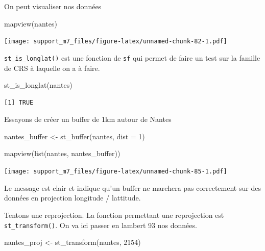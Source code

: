 \documentclass[
]{book}
\newenvironment{Shaded}{\begin{snugshade}}{\end{snugshade}}
\newcommand{\AttributeTok}[1]{\textcolor[rgb]{0.77,0.63,0.00}{#1}}
\newcommand{\DecValTok}[1]{\textcolor[rgb]{0.00,0.00,0.81}{#1}}
\newcommand{\FunctionTok}[1]{\textcolor[rgb]{0.00,0.00,0.00}{#1}}
\newcommand{\NormalTok}[1]{#1}
\newcommand{\OtherTok}[1]{\textcolor[rgb]{0.56,0.35,0.01}{#1}}
\begin{document}
On peut visualiser nos données

\begin{Shaded}
\begin{Highlighting}[]
\FunctionTok{mapview}\NormalTok{(nantes)}
\end{Highlighting}
\end{Shaded}

\texttt{[image: support\_m7\_files/figure-latex/unnamed-chunk-82-1.pdf]}

\texttt{st\_is\_longlat()} est une fonction de \texttt{sf} qui permet de faire un test sur la famille de CRS à laquelle on a à faire.

\begin{Shaded}
\begin{Highlighting}[]
\FunctionTok{st\_is\_longlat}\NormalTok{(nantes)}
\end{Highlighting}
\end{Shaded}

\begin{verbatim}
[1] TRUE
\end{verbatim}

Essayons de créer un buffer de 1km autour de Nantes

\begin{Shaded}
\begin{Highlighting}[]
\NormalTok{nantes\_buffer }\OtherTok{\textless{}{-}} \FunctionTok{st\_buffer}\NormalTok{(nantes, }\AttributeTok{dist =} \DecValTok{1}\NormalTok{)}
\end{Highlighting}
\end{Shaded}

\begin{Shaded}
\begin{Highlighting}[]
\FunctionTok{mapview}\NormalTok{(}\FunctionTok{list}\NormalTok{(nantes, nantes\_buffer))}
\end{Highlighting}
\end{Shaded}

\texttt{[image: support\_m7\_files/figure-latex/unnamed-chunk-85-1.pdf]}

Le message est clair et indique qu'un buffer ne marchera pas correctement sur des données en projection longitude / lattitude.

Tentons une reprojection. La fonction permettant une reprojection est \texttt{st\_transform()}.
On va ici passer en lambert 93 nos données.

\begin{Shaded}
\begin{Highlighting}[]
\NormalTok{nantes\_proj }\OtherTok{\textless{}{-}} \FunctionTok{st\_transform}\NormalTok{(nantes, }\DecValTok{2154}\NormalTok{)}
\end{Highlighting}
\end{Shaded}
\end{document}
